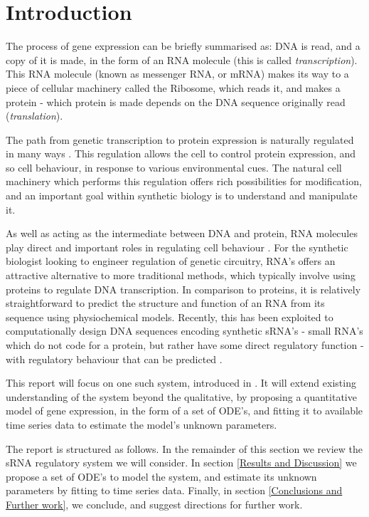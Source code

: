 \documentclass[10pt,journal]{./IEEE_latex_class/IEEEtran}
\begin{document}
\IEEEpeerreviewmaketitle




\section{Introduction}
\label{sec: Intro}
The process of gene expression can be briefly summarised as: DNA is read, and a copy of it is made, in the form of an RNA molecule (this is called \textit{transcription}). This RNA molecule (known as messenger RNA, or mRNA) makes its way to a piece of cellular machinery called the Ribosome, which reads it, and makes a protein - which protein is made depends on the DNA sequence originally read (\textit{translation}).  

 The path from genetic transcription to protein expression is naturally regulated in many ways \cite{MolecularBiology}. This regulation allows the cell to control protein expression, and so cell behaviour, in response to various environmental cues. The natural cell machinery which performs this regulation offers rich possibilities for modification, and an important goal within synthetic biology is to understand and manipulate it.

As well as acting as the intermediate between DNA and protein, RNA molecules play direct and important roles in regulating cell behaviour \cite{Isaacs2006}. For the synthetic biologist looking to engineer regulation of genetic circuitry, RNA's offers an attractive alternative to more traditional methods, which typically involve using proteins to regulate DNA transcription. In comparison to proteins, it is relatively straightforward to predict the structure and function of an RNA from its sequence using physiochemical models. Recently, this has been exploited to computationally design DNA sequences encoding synthetic sRNA's - small RNA's which do not code for a protein, but rather have some direct regulatory function -  with regulatory behaviour that can be predicted \cite{Rodrigo2013}\cite{Rodrigo2012}.

This report will focus on one such system, introduced in \cite{Rodrigo2012}. It will extend existing understanding of the system beyond the qualitative, by proposing a quantitative model of gene expression, in the form of a set of ODE's, and fitting it to available time series data to estimate the model's unknown parameters.

The report is structured as follows. In the remainder of this section we review the sRNA regulatory system we will consider. In section \ref{Results and Discussion} we propose a set of ODE's to model the system, and estimate its unknown parameters by fitting to time series data. Finally, in section \ref{Conclusions and Further work}, we conclude, and suggest directions for further work.
\end{document}
